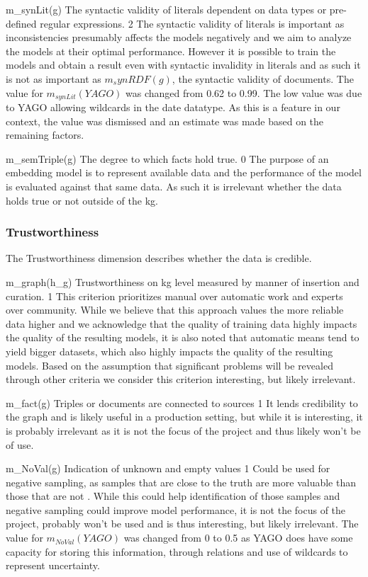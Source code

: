 \weighttable
{m_{synLit}(g)}
{The syntactic validity of literals dependent on data types or pre-defined regular expressions.}
{2}
{The syntactic validity of literals is important as inconsistencies presumably affects the models negatively and we aim to analyze the models at their optimal performance. However it is possible to train the models and obtain a result even with syntactic invalidity in literals and as such it is not as important as $m_synRDF(g)$, the syntactic validity of documents.}
{The value for $m_{synLit}(YAGO)$ was changed from 0.62 to 0.99. The low value was due to YAGO allowing wildcards in the date datatype. As this is a feature in our context, the value was dismissed and an estimate was made based on the remaining factors.}

\weighttable
{m_{semTriple}(g)}
{The degree to which facts hold true.}
{0}
{The purpose of an embedding model is to represent available data and the performance of the model is evaluated against that same data. As such it is irrelevant whether the data holds true or not outside of the \gls{kg}.}
{}

\subsubsection{Trustworthiness}
The Trustworthiness dimension describes whether the data is credible.

\weighttable
{m_{graph}(h_g)}
{Trustworthiness on \gls{kg} level measured by manner of insertion and curation.}
{1}
{This criterion prioritizes manual over automatic work and experts over community. 
While we believe that this approach values the more reliable data higher and we acknowledge that the quality of training data highly impacts the quality of the resulting models, it is also noted that automatic means tend to yield bigger datasets, which also highly impacts the quality of the resulting models. Based on the assumption that significant problems will be revealed through other criteria we consider this criterion interesting, but likely irrelevant.}
{}

\weighttable
{m_{fact}(g)}
{Triples or documents are connected to sources}
{1}
{It lends credibility to the graph and is likely useful in a production setting, but while it is interesting, it is probably irrelevant as it is not the focus of the project and thus likely won't be of use.}
{}

\weighttable
{m_{NoVal}(g)}
{Indication of unknown and empty values}
{1}
{Could be used for negative sampling, as samples that are close to the truth are more valuable than those that are not \cite{yang2020negative-sampling, hyunh2019fact-checking-benchmark}. While this could help identification of those samples and negative sampling could improve model performance, it is not the focus of the project, probably won't be used and is thus interesting, but likely irrelevant.}
{The value for $m_{NoVal}(YAGO)$ was changed from 0 to 0.5 as YAGO does have some capacity for storing this information, through relations and use of wildcards to represent uncertainty.}

